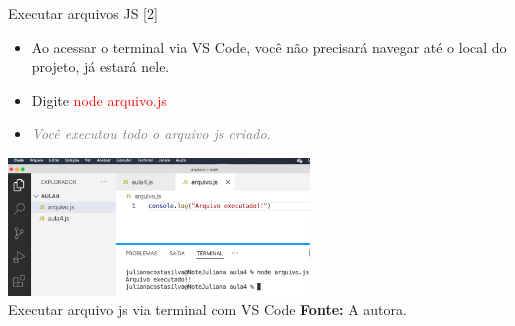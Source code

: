 \documentclass{beamer}
\begin{document}
\begin{frame}{Executar arquivos JS [2]}

    \begin{itemize}
        \item Ao acessar o terminal via VS Code, você não precisará navegar até o local do projeto, já estará nele.
        \item Digite \textcolor{red}{node arquivo.js}
        \item \textcolor{gray}{\textit{Você executou todo o arquivo js criado.}}
    \end{itemize}
    \centering
	\includegraphics[width=80mm]{aulas/resources/aula_js_4_2.png}\\
            \tiny{ Executar arquivo js via terminal com VS Code \textbf{Fonte:} A autora.}
\end{frame}
\end{document}
